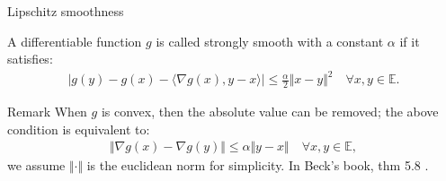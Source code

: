 \documentclass[11pt]{beamer}
\begin{document}
        \begin{frame}{Lipschitz smoothness}
            \begin{definition}\label{def:strong_smoothness}
                A differentiable function $g$ is called strongly smooth with a constant $\alpha$ if it satisfies: 
                \begin{align}
                    |g(y) - g(x) - 
                    \langle \nabla g(x), y - x
                    \rangle| \le \frac{\alpha}{2}\Vert x - y\Vert^2
                    \quad \forall x, y\in \mathbb E. 
                \end{align}    
            \end{definition}
            \begin{block}{Remark}
                When $g$ is convex, then the absolute value can be removed; the above condition is equivalent to: 
                \begin{align*}
                   \Vert \nabla g(x) - \nabla g(y)\Vert \le \alpha\Vert y - x \Vert\quad 
                   \forall x, y \in \mathbb E,
                \end{align*}
                we assume $\Vert \cdot\Vert$ is the euclidean norm for simplicity. In Beck's book, thm 5.8 \cite{book:first_order_opt}. 
            \end{block}
        \end{frame}
\end{document}
